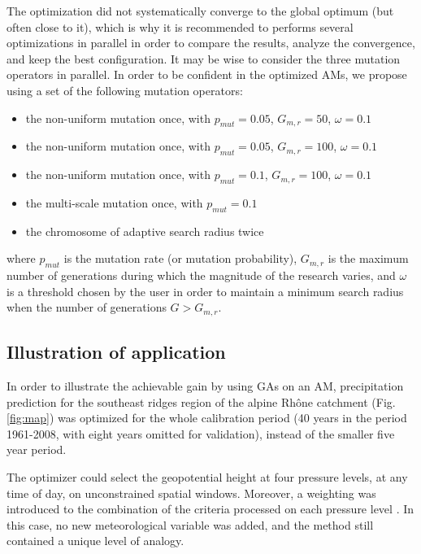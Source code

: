 \documentclass{ametsoc}
\begin{document}
The optimization did not systematically converge to the global optimum (but often close to it), which is why it is recommended to performs several optimizations in parallel in order to compare the results, analyze the convergence, and keep the best configuration. It may be wise to consider the three mutation operators in parallel. In order to be confident in the optimized AMs, we propose using a set of the following mutation operators:

\begin{itemize}
	\setlength\itemsep{-4px}
	\item the non-uniform mutation once, with $p_{mut}=0.05$, $G_{m,r}=50$, $\omega=0.1$
	\item the non-uniform mutation once, with $p_{mut}=0.05$, $G_{m,r}=100$, $\omega=0.1$
	\item the non-uniform mutation once, with $p_{mut}=0.1$, $G_{m,r}=100$, $\omega=0.1$
	\item the multi-scale mutation once, with  $p_{mut}=0.1$
	\item the chromosome of adaptive search radius twice
\end{itemize}

where $p_{mut}$ is the mutation rate (or mutation probability), $G_{m,r}$ is the maximum number of generations during which the magnitude of the research varies, and $\omega$ is a threshold chosen by the user in order to maintain a minimum search radius when the number of generations $G>G_{m,r}$.


\subsection{Illustration of application}

In order to illustrate the achievable gain by using GAs on an AM, precipitation prediction for the southeast ridges region of the alpine Rh\^{o}ne catchment (Fig. \ref{fig:map}) was optimized for the whole calibration period (40 years in the period 1961-2008, with eight years omitted for validation), instead of the smaller five year period.

The optimizer could select the geopotential height at four pressure levels, at any time of day, on unconstrained spatial windows. Moreover, a weighting was introduced to the combination of the criteria processed on each pressure level \citep[such as in][]{Horton2012a, Junk2015}. In this case, no new meteorological variable was added, and the method still contained a unique level of analogy.
\end{document}
